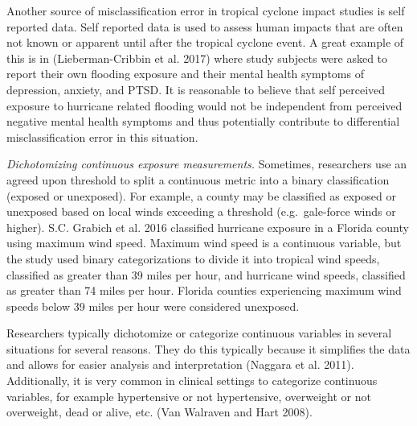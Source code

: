 \documentclass[]{article}
\begin{document}
Another source of misclassification error in tropical cyclone impact
studies is self reported data. Self reported data is used to assess
human impacts that are often not known or apparent until after the
tropical cyclone event. A great example of this is in (Lieberman-Cribbin
et al. 2017) where study subjects were asked to report their own
flooding exposure and their mental health symptoms of depression,
anxiety, and PTSD. It is reasonable to believe that self perceived
exposure to hurricane related flooding would not be independent from
perceived negative mental health symptoms and thus potentially
contribute to differential misclassification error in this situation.

\emph{Dichotomizing continuous exposure measurements.} Sometimes,
researchers use an agreed upon threshold to split a continuous metric
into a binary classification (exposed or unexposed). For example, a
county may be classified as exposed or unexposed based on local winds
exceeding a threshold (e.g.~gale-force winds or higher). S.C. Grabich et
al. 2016 classified hurricane exposure in a Florida county using maximum
wind speed. Maximum wind speed is a continuous variable, but the study
used binary categorizations to divide it into tropical wind speeds,
classified as greater than 39 miles per hour, and hurricane wind speeds,
classified as greater than 74 miles per hour. Florida counties
experiencing maximum wind speeds below 39 miles per hour were considered
unexposed.

Researchers typically dichotomize or categorize continuous variables in
several situations for several reasons. They do this typically because
it simplifies the data and allows for easier analysis and interpretation
(Naggara et al. 2011). Additionally, it is very common in clinical
settings to categorize continuous variables, for example hypertensive or
not hypertensive, overweight or not overweight, dead or alive, etc. (Van
Walraven and Hart 2008).
\end{document}
